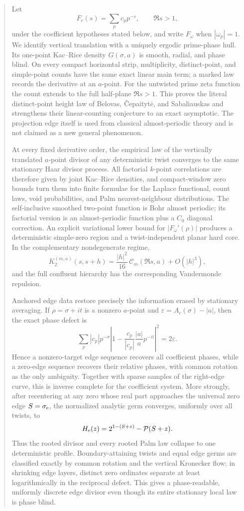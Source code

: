 \documentclass[11pt]{article}
\theoremstyle{definition}
\theoremstyle{remark}
\begin{document}
\begin{abstract}
Let
\[
  F_c(s)=\sum_{p}c_pp^{-s},\qquad \Re s>1,
\]
under the coefficient hypotheses stated below, and write $F_\omega$ when
$|\omega_p|=1$.  We identify vertical translation with a uniquely ergodic
prime-phase hull.  Its one-point Kac--Rice density $G(\sigma,a)$ is smooth,
radial, and phase blind.  On every compact horizontal strip, multiplicity,
distinct-point, and simple-point counts have the same exact linear main term;
a marked law records the derivative at an $a$-point.  For the untwisted prime
zeta function the count extends to the full half-plane $\Re s>1$.  This proves
the literal distinct-point height law of Belovas, \v{C}epaityt\.{e}, and
Sabaliauskas and strengthens their linear-counting conjecture to an exact
asymptotic.  The projection edge itself is used from classical
almost-periodic theory and is not claimed as a new general phenomenon.

At every fixed derivative order, the empirical law of the vertically
translated $a$-point divisor of any deterministic twist converges to the same
stationary Haar divisor process.  All factorial $k$-point correlations are
therefore given by joint Kac--Rice densities, and compact-window zero bounds
turn them into finite formulae for the Laplace functional, count laws, void
probabilities, and Palm nearest-neighbour distributions.  The self-inclusive
smoothed two-point function is Bohr almost periodic; its factorial version is
an almost-periodic function plus a $C_0$ diagonal correction.  An explicit
variational lower bound for $|F_\omega'(\rho)|$ produces a deterministic
simple-zero region and a twist-independent planar hard core.  In the
complementary nondegenerate regime,
\[
 K_2^{(m,a)}(s,s+h)=\frac{|h|^2}{16}\,\mathcal C_m(\Re s,a)+O(|h|^3),
\]
and the full confluent hierarchy has the corresponding Vandermonde repulsion.

Anchored edge data restore precisely the information erased by stationary
averaging.  If $\rho=\sigma+it$ is a nonzero $a$-point and
$\varepsilon=A_c(\sigma)-|a|$, then the exact phase defect is
\[
 \sum_p |c_p|p^{-\sigma}
 \left|1-\frac{c_p}{|c_p|}\frac{|a|}{a}p^{-it}\right|^2
 =2\varepsilon.
\]
Hence a nonzero-target edge sequence recovers all coefficient phases, while a
zero-edge sequence recovers their relative phases, with common rotation as the
only ambiguity.  Together with sparse samples of the right-edge curve, this is
inverse complete for the coefficient system.  More strongly, after recentering
at any zero whose real part approaches the universal zero edge
$S=\sigma_{\rm e}$, the normalized analytic germ converges, uniformly over all
twists, to
\[
 H_{\rm e}(z)=2^{1-(S+z)}-\mathcal P(S+z).
\]
Thus the rooted divisor and every rooted Palm law collapse to one deterministic
profile.  Boundary-attaining twists and equal edge germs are classified exactly
by common rotation and the vertical Kronecker flow; in shrinking edge layers,
distinct zero ordinates separate at least logarithmically in the reciprocal
defect.  This gives a phase-readable, uniformly discrete edge divisor even
though its entire stationary local law is phase blind.


\end{abstract}
\end{document}
